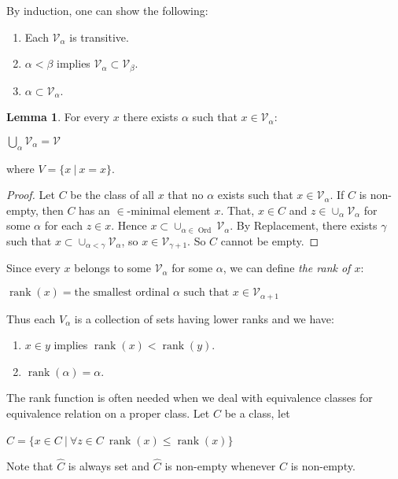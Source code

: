 \documentclass[8pt]{article}
\theoremstyle{definition}
\theoremstyle{definition}
\theoremstyle{definition}
\theoremstyle{definition}
\theoremstyle{definition}
\theoremstyle{definition}
\theoremstyle{definition}
\theoremstyle{definition}
\newtheorem{lemma}{Lemma}[section]
\theoremstyle{definition}
\theoremstyle{definition}
\theoremstyle{definition}
\theoremstyle{definition}
\theoremstyle{definition}
\theoremstyle{definition}
\theoremstyle{question}
\begin{document}
By induction, one can show the following:
\begin{enumerate}
  \item Each $\mathcal{V}_{\alpha}$ is transitive.
  \item $\alpha < \beta$ implies $\mathcal{V}_{\alpha} \subset \mathcal{V}_{\beta}$.
  \item $\alpha \subset \mathcal{V}_{\alpha}$.
\end{enumerate}

\begin{lemma}
  For every $x$ there exists $\alpha$ such that $x \in \mathcal{V}_{\alpha}$:
\begin{center}
  $\bigcup \limits_{\alpha} \mathcal{V}_{\alpha} = \mathcal{V}$
\end{center}
where $V = \{ x \: | \: x = x\}$.
\end{lemma}

\begin{proof}
Let $C$ be the class of all $x$ that no $\alpha$ exists such that $x \in \mathcal{V}_{\alpha}$.
If $C$ is non-empty, then $C$ has an $\in$-minimal element $x$.
That, $x \in C$ and $z \in \cup_{\alpha} \mathcal{V}_{\alpha}$ for some $\alpha$ for each $z \in x$.
Hence $x \subset \cup_{\alpha \in \operatorname{Ord}} \mathcal{V}_{\alpha}$.
By Replacement, there exists $\gamma$ such that $x \subset \cup_{\alpha < \gamma} \mathcal{V}_{\alpha}$, so 
$x \in \mathcal{V}_{\gamma + 1}$. So $C$ cannot be empty.
\end{proof}

Since every $x$ belongs to some $\mathcal{V}_{\alpha}$ for some $\alpha$, we can define \emph{the rank of $x$}:
\begin{center}
  $\operatorname{rank}(x) = \text{the smallest ordinal $\alpha$ such that $x \in \mathcal{V}_{\alpha + 1}$}$
\end{center}
Thus each $V_{\alpha}$ is a collection of sets having lower ranks and we have:
\begin{enumerate}
  \item $x \in y$ implies $\operatorname{rank}(x) < \operatorname{rank}(y)$.
  \item $\operatorname{rank}(\alpha)=\alpha$.
\end{enumerate}

The rank function is often needed when we deal with equivalence classes for equivalence relation on a proper class.
Let $C$ be a class, let
\begin{center}
  $\hat{C} = \{ x \in C \: | \: \forall z \in C \: \operatorname{rank}(x) \leq \operatorname{rank}(x) \}$
\end{center}
Note that $\hat{C}$ is always set and $\hat{C}$ is non-empty whenever $C$ is non-empty.
\end{document}
